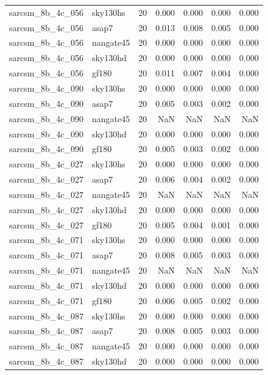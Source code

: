 \begin{tabular}{llrrrrr}
sarcsm\_8b\_4c\_056 & sky130hs & 20 & 0.000 & 0.000 & 0.000 & 0.000 \\
sarcsm\_8b\_4c\_056 & asap7 & 20 & 0.013 & 0.008 & 0.005 & 0.000 \\
sarcsm\_8b\_4c\_056 & nangate45 & 20 & 0.000 & 0.000 & 0.000 & 0.000 \\
sarcsm\_8b\_4c\_056 & sky130hd & 20 & 0.000 & 0.000 & 0.000 & 0.000 \\
sarcsm\_8b\_4c\_056 & gf180 & 20 & 0.011 & 0.007 & 0.004 & 0.000 \\
sarcsm\_8b\_4c\_090 & sky130hs & 20 & 0.000 & 0.000 & 0.000 & 0.000 \\
sarcsm\_8b\_4c\_090 & asap7 & 20 & 0.005 & 0.003 & 0.002 & 0.000 \\
sarcsm\_8b\_4c\_090 & nangate45 & 20 & NaN & NaN & NaN & NaN \\
sarcsm\_8b\_4c\_090 & sky130hd & 20 & 0.000 & 0.000 & 0.000 & 0.000 \\
sarcsm\_8b\_4c\_090 & gf180 & 20 & 0.005 & 0.003 & 0.002 & 0.000 \\
sarcsm\_8b\_4c\_027 & sky130hs & 20 & 0.000 & 0.000 & 0.000 & 0.000 \\
sarcsm\_8b\_4c\_027 & asap7 & 20 & 0.006 & 0.004 & 0.002 & 0.000 \\
sarcsm\_8b\_4c\_027 & nangate45 & 20 & NaN & NaN & NaN & NaN \\
sarcsm\_8b\_4c\_027 & sky130hd & 20 & 0.000 & 0.000 & 0.000 & 0.000 \\
sarcsm\_8b\_4c\_027 & gf180 & 20 & 0.005 & 0.004 & 0.001 & 0.000 \\
sarcsm\_8b\_4c\_071 & sky130hs & 20 & 0.000 & 0.000 & 0.000 & 0.000 \\
sarcsm\_8b\_4c\_071 & asap7 & 20 & 0.008 & 0.005 & 0.003 & 0.000 \\
sarcsm\_8b\_4c\_071 & nangate45 & 20 & NaN & NaN & NaN & NaN \\
sarcsm\_8b\_4c\_071 & sky130hd & 20 & 0.000 & 0.000 & 0.000 & 0.000 \\
sarcsm\_8b\_4c\_071 & gf180 & 20 & 0.006 & 0.005 & 0.002 & 0.000 \\
sarcsm\_8b\_4c\_087 & sky130hs & 20 & 0.000 & 0.000 & 0.000 & 0.000 \\
sarcsm\_8b\_4c\_087 & asap7 & 20 & 0.008 & 0.005 & 0.003 & 0.000 \\
sarcsm\_8b\_4c\_087 & nangate45 & 20 & 0.000 & 0.000 & 0.000 & 0.000 \\
sarcsm\_8b\_4c\_087 & sky130hd & 20 & 0.000 & 0.000 & 0.000 & 0.000 \\

\end{tabular}
